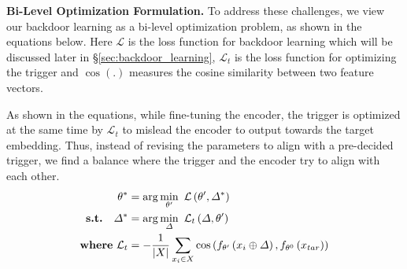 \textbf{Bi-Level Optimization Formulation.} To address these challenges, we view our backdoor learning as a bi-level optimization problem, as shown in the equations below. Here $\mathcal{L}$ is the loss function for backdoor learning which will be discussed later in \S\ref{sec:backdoor_learning}, $\mathcal{L}_t$ is the loss function for optimizing the trigger and $\cos(.)$ measures the cosine similarity between two feature vectors. 

As shown in the equations, while fine-tuning the encoder, the trigger is optimized at the same time by $\mathcal{L}_t$ to mislead the encoder to output towards the target embedding. Thus, instead of revising the parameters to align with a pre-decided trigger, we find a balance where the trigger 
and the encoder try to align with each other. 
\begin{align}
    \theta^* &= \arg\min_{\theta'}~\mathcal{L}\left(\theta',\varDelta^*\right) \label{eq:bi-level}\\
    \text{\textbf{s.t.}}\quad\varDelta^* &= \arg\min_{\varDelta}~\mathcal{L}_t \left( \varDelta, \theta' \right) \label{eq:trigger_loss1} \\
   \text{\textbf{where}}~\mathcal{L}_t &= -\frac{1}{\left| X \right|} \sum_{x_i \in X} \cos\left( f_{\theta'}\left( x_i \oplus \varDelta \right), f_{\theta^0}\left( x_{tar} \right) \right) \label{eq:trigger_loss2}
\end{align}

